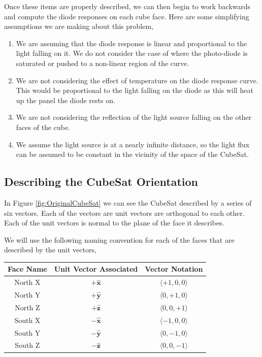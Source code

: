 \documentclass[10pt, letterpaper]{article}
\begin{document}
Once these items are properly described, we can then begin to work backwards and compute the diode responses on each cube face. Here are some simplifying assumptions we are making about this problem,

\begin{enumerate}
    \item We are assuming that the diode response is linear and proportional to the light falling on it. We do not consider the case of where the photo-diode is saturated or pushed to a non-linear region of the curve.
    \item We are not considering the effect of temperature on the diode response curve. This would be proportional to the light falling on the diode as this will heat up the panel the diode rests on.
    \item We are not considering the reflection of the light source falling on the other faces of the cube.
    \item We assume the light source is at a nearly infinite distance, so the light flux can be assumed to be constant in the vicinity of the space of the CubeSat.
\end{enumerate}

\subsection{Describing the CubeSat Orientation}

In Figure \ref{fig:OriginalCubeSat} we can see the CubeSat described by a series of six vectors. Each of the vectors are unit vectors are orthogonal to each other. Each of the unit vectors is normal to the plane of the face it describes.

We will use the following naming convention for each of the faces that are described by the unit vectors,

\begin{center}
\begin{tabular}{|c|c|c|}
    \hline
    Face Name & Unit Vector Associated & Vector Notation \\ \hline
    North X & $+\mathbf{\hat{x}}$ & $\langle +1, 0, 0 \rangle$ \\
    North Y & $+\mathbf{\hat{y}}$ & $\langle 0, +1, 0 \rangle$ \\
    North Z & $+\mathbf{\hat{z}}$ & $\langle 0, 0, +1 \rangle$ \\
    South X & $-\mathbf{\hat{x}}$ & $\langle -1, 0, 0 \rangle$ \\
    South Y & $-\mathbf{\hat{y}}$ & $\langle 0, -1, 0 \rangle$ \\
    South Z & $-\mathbf{\hat{z}}$ & $\langle 0, 0, -1 \rangle$ \\ \hline
\end{tabular}
\end{center}
\end{document}

